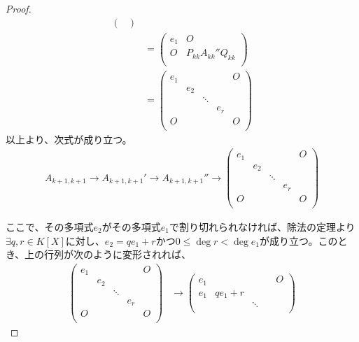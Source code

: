 \documentclass[dvipdfmx]{jsarticle}
\begin{document}
\begin{proof}
\begin{align*}
\begin{pmatrix}
\end{pmatrix}\\
&= \begin{pmatrix}
e_{1} & O \\
O & P_{kk}A_{kk}''Q_{kk} \\
\end{pmatrix}\\
&= \begin{pmatrix}
e_{1} & \  & \  & \  & O \\
\  & e_{2} & \  & \  & \  \\
\  & \  & \ddots & \  & \  \\
\  & \  & \  & e_{r} & \  \\
O & \  & \  & \  & O \\
\end{pmatrix}
\end{align*}
以上より、次式が成り立つ。
\begin{align*}
A_{k + 1,k + 1} \rightarrow A_{k + 1,k + 1}' \rightarrow A_{k + 1,k + 1}'' \rightarrow \begin{pmatrix}
e_{1} & \  & \  & \  & O \\
\  & e_{2} & \  & \  & \  \\
\  & \  & \ddots & \  & \  \\
\  & \  & \  & e_{r} & \  \\
O & \  & \  & \  & O \\
\end{pmatrix}
\end{align*}\par
ここで、その多項式$e_{2}$がその多項式$e_{1}$で割り切れられなければ、除法の定理より$\exists q,r \in K[ X]$に対し、$e_{2} = qe_{1} + r$かつ$0 \leq \deg r < \deg e_{1}$が成り立つ。このとき、上の行列が次のように変形されれば、
\begin{align*}
\begin{pmatrix}
e_{1} & \  & \  & \  & O \\
\  & e_{2} & \  & \  & \  \\
\  & \  & \ddots & \  & \  \\
\  & \  & \  & e_{r} & \  \\
O & \  & \  & \  & O \\
\end{pmatrix} &\rightarrow \begin{pmatrix}
e_{1} & \  & \  & \  & O \\
e_{1} & qe_{1} + r & \  & \  & \  \\
\  & \  & \ddots & \  & \  \\

\end{pmatrix}
\end{align*}
\end{proof}
\end{document}
